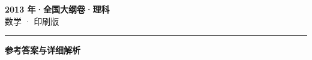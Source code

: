 \documentclass[zihao=5, a4paper]{ctexart}
\begin{document}
\begin{center}
  {\Large\bfseries 2013 年·全国大纲卷·理科}\\[4pt]
  {\large 数学 · 印刷版}
\end{center}
\medskip
{}

\par\bigskip\hrule\bigskip
{}
\Needspace{0.55\textheight}
\begin{center}{\large\bfseries 参考答案与详细解析}\end{center}
\smallskip

\end{document}
